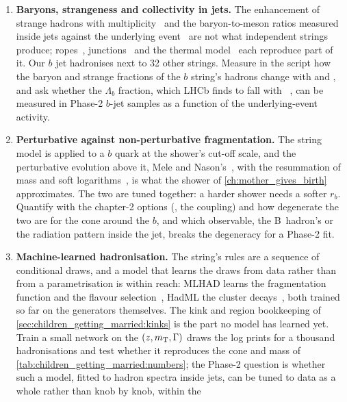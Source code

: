 \begin{enumerate}
  \item \textbf{Baryons, strangeness and collectivity in jets.} The
    enhancement of strange hadrons with
    multiplicity~\cite{ALICE:2016fzo} and the baryon-to-meson ratios
    measured inside jets against the underlying event~\cite{ALICE:2022ecr}
    are not what independent strings produce; ropes~\cite{Bierlich:2014xba},
    junctions~\cite{Christiansen:2015yqa,Sjostrand:2002ip} and the thermal
    model~\cite{Fischer:2016zzs} each reproduce part of it. Our $b$ jet
    hadronises next to 32 other strings. Measure in the script how the
    baryon and strange fractions of the $b$ string's hadrons change with
     and , and ask whether the $\Lambda_b$
    fraction, which LHCb finds to fall with \pt~\cite{LHCb:2019fns}, can
    be measured in Phase-2 $b$-jet samples as a function of the
    underlying-event activity.
  \item \textbf{Perturbative against non-perturbative fragmentation.} The
    string model is applied to a $b$ quark at the shower's cut-off scale,
    and the perturbative evolution above it, Mele and
    Nason's~\cite{Mele:1990cw,Cacciari:2005uk}, with the resummation of
    mass and soft logarithms~\cite{Ghira:2023bxr}, is what the shower of
    \cref{ch:mother_gives_birth} approximates. The two are tuned together:
    a harder shower needs a softer $r_b$. Quantify with the chapter-2
    options (, the coupling) and  how
    degenerate the two are for the cone around the $b$, and which
    observable, the B~hadron's \xE or the radiation pattern inside the
    jet, breaks the degeneracy for a Phase-2 fit.
  \item \textbf{Machine-learned hadronisation.} The string's rules are a
    sequence of conditional draws, and a model that learns the draws from
    data rather than from a parametrisation is within reach: MLHAD learns
    the fragmentation function and the flavour selection~\cite{Ilten:2022jfm,Bierlich:2023zzd},
    HadML the cluster decays~\cite{Ghosh:2022zdz}, both trained so far on
    the generators themselves. The kink and region bookkeeping of
    \cref{sec:children_getting_married:kinks} is the part no model has
    learned yet. Train a small network on the $(z,m_{\mathrm{T}},\Gamma)$ draws the
     log prints for a thousand hadronisations and test whether it
    reproduces the cone \pt and mass of
    \cref{tab:children_getting_married:numbers}; the Phase-2 question is
    whether such a model, fitted to hadron spectra inside jets, can be
    tuned to data as a whole rather than knob by knob, within the

\end{enumerate}
